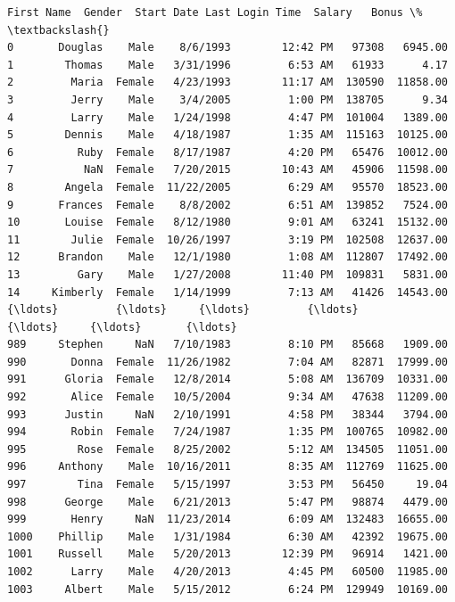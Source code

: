 \documentclass [oneside,10pt,a4paper,ngerman,BCOR10mm,headsepline,parindent,final]{scrartcl}
\makeatletter
\newcommand{\boxspacing}{\kern\kvtcb@left@rule\kern\kvtcb@boxsep}
\newcommand{\prompt}[4]{
        {\ttfamily\llap{{\color{#2}[#3]:\hspace{3pt}#4}}\vspace{-\baselineskip}}
    }
\makeatother
\begin{document}
            \begin{tcolorbox}[breakable, size=fbox, boxrule=.5pt, pad at break*=1mm, opacityfill=0]
\prompt{Out}{outcolor}{145}{\boxspacing}
\begin{Verbatim}[commandchars=\\\{\}]
     First Name  Gender  Start Date Last Login Time  Salary   Bonus \%  \textbackslash{}
0       Douglas    Male    8/6/1993        12:42 PM   97308   6945.00
1        Thomas    Male   3/31/1996         6:53 AM   61933      4.17
2         Maria  Female   4/23/1993        11:17 AM  130590  11858.00
3         Jerry    Male    3/4/2005         1:00 PM  138705      9.34
4         Larry    Male   1/24/1998         4:47 PM  101004   1389.00
5        Dennis    Male   4/18/1987         1:35 AM  115163  10125.00
6          Ruby  Female   8/17/1987         4:20 PM   65476  10012.00
7           NaN  Female   7/20/2015        10:43 AM   45906  11598.00
8        Angela  Female  11/22/2005         6:29 AM   95570  18523.00
9       Frances  Female    8/8/2002         6:51 AM  139852   7524.00
10       Louise  Female   8/12/1980         9:01 AM   63241  15132.00
11        Julie  Female  10/26/1997         3:19 PM  102508  12637.00
12      Brandon    Male   12/1/1980         1:08 AM  112807  17492.00
13         Gary    Male   1/27/2008        11:40 PM  109831   5831.00
14     Kimberly  Female   1/14/1999         7:13 AM   41426  14543.00
{\ldots}         {\ldots}     {\ldots}         {\ldots}             {\ldots}     {\ldots}       {\ldots}
989     Stephen     NaN   7/10/1983         8:10 PM   85668   1909.00
990       Donna  Female  11/26/1982         7:04 AM   82871  17999.00
991      Gloria  Female   12/8/2014         5:08 AM  136709  10331.00
992       Alice  Female   10/5/2004         9:34 AM   47638  11209.00
993      Justin     NaN   2/10/1991         4:58 PM   38344   3794.00
994       Robin  Female   7/24/1987         1:35 PM  100765  10982.00
995        Rose  Female   8/25/2002         5:12 AM  134505  11051.00
996     Anthony    Male  10/16/2011         8:35 AM  112769  11625.00
997        Tina  Female   5/15/1997         3:53 PM   56450     19.04
998      George    Male   6/21/2013         5:47 PM   98874   4479.00
999       Henry     NaN  11/23/2014         6:09 AM  132483  16655.00
1000    Phillip    Male   1/31/1984         6:30 AM   42392  19675.00
1001    Russell    Male   5/20/2013        12:39 PM   96914   1421.00
1002      Larry    Male   4/20/2013         4:45 PM   60500  11985.00
1003     Albert    Male   5/15/2012         6:24 PM  129949  10169.00


\end{Verbatim}
\end{tcolorbox}
\end{document}
